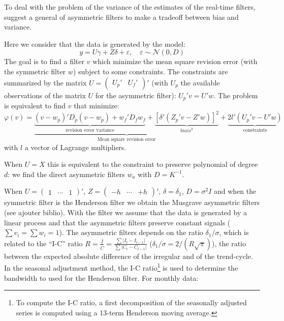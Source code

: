 \documentclass[
  12pt,
  ,
  a4paper]{article}
\newcommand\1{\mathds{1}}
\begin{document}
To deal with the problem of the variance of the estimates of the real-time filters, \textcite{proietti2008} suggest a general of asymmetric filters to make a tradeoff between bias and variance.

Here we consider that the data is generated by the model:
\[
y=U\gamma+Z\delta+\varepsilon,\quad
\varepsilon\sim\mathcal{N}(0,D)
\]
The goal is to find a filter \(v\) which minimize the mean square revision error (with the symmetric filter \(w\)) subject to some constraints.
The constraints are summarized by the matrix \(U=\begin{pmatrix}U_{p}'&U_{f}'\end{pmatrix}'\) (with \(U_p\) the available observations of the matrix \(U\) for the asymmetric filter): \(U_p'v=U'w\).
The problem is equivalent to find \(v\) that minimize:
\[
\varphi(v)=
\underbrace{
  \underbrace{(v-w_{p})'D_{p}(v-w_{p})+
  w_{f}'D_{f}w_{f}}_\text{revision error variance}+
  \underbrace{[\delta'(Z_{p}'v-Z'w)]^{2}}_{biais^2}
}_\text{Mean square revision error}+
\underbrace{2l'(U_{p}'v-U'w)}_{\text{constraints}}
\]
with \(l\) a vector of Lagrange multipliers.

When \(U=X\) this is equivalent to the constraint to preserve polynomial of degree \(d\): we find the direct asymmetric filters \(w_a\) with \(D=K^{-1}\).

When \(U=\begin{pmatrix}1&\cdots&1\end{pmatrix}'\), \(Z=\begin{pmatrix}-h&\cdots&+h\end{pmatrix}'\), \(\delta=\delta_1\), \(D=\sigma^2I\) and when the symmetric filter is the Henderson filter we obtain the Musgrave asymmetric filters (see \colorbox{BurntOrange}{ajouter biblio}).
With the filter we assume that the data is generated by a linear process and that the asymmetric filters preserve constant signals (\(\sum v_i=\sum w_i=1\)).
The asymmetric filters depends on the ratio \(\delta_1/\sigma\), which is related to the ``I-C'' ratio \(R=\frac{\bar{I}}{\bar{C}}=\frac{\sum\lvert I_t-I_{t-1}\rvert}{\sum\lvert C_t-C_{t-1}\rvert}\) (\(\delta_1/\sigma=2/(R\sqrt{\pi})\)), the ratio between the expected absolute difference of the irregular and of the trend-cycle.
In the seasonal adjustment method, the I-C ratio\footnote{To compute the I-C ratio, a first decomposition of the seasonally adjusted series is computed using a 13-term Henderson moving average.} is used to determine the bandwidth to used for the Henderson filter. For monthly data:
\end{document}
